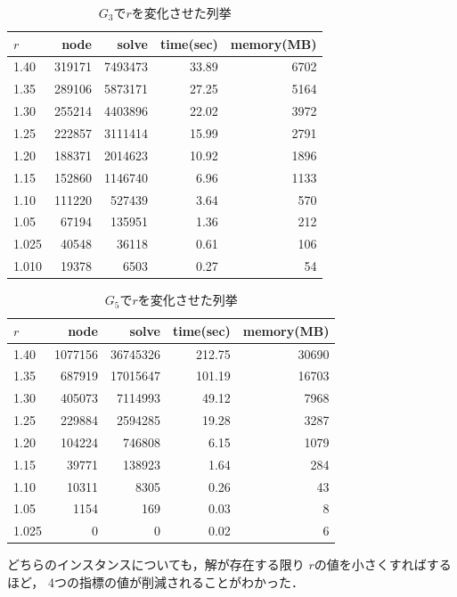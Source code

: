 \begin{table}[htbp]
  \caption{$G_3$で$r$を変化させた列挙}
  \label{table:g3_r}
  \centering
  \begin{tabular}{l||r|r|r|r}
    \hline
    $r$ & node & solve & time(sec) & memory(MB) \\
    \hline \hline
    1.40 & 319171 & 7493473 &	33.89 &	6702 \\
    1.35 & 289106 &	5873171 &	27.25 &	5164 \\
    1.30 & 255214	& 4403896	& 22.02	& 3972 \\
    1.25 & 222857	& 3111414	& 15.99	& 2791 \\
    1.20 & 188371	& 2014623	& 10.92	& 1896 \\
    1.15 & 152860	& 1146740	& 6.96	& 1133 \\
    1.10 & 111220	& 527439	& 3.64	& 570 \\
    1.05 & 67194	& 135951	& 1.36	& 212 \\
    1.025 & 40548	& 36118	& 0.61	& 106 \\
    1.010 & 19378	& 6503 & 0.27 & 54 \\
    \hline
  \end{tabular}
\end{table}

\begin{table}[htbp]
  \caption{$G_5$で$r$を変化させた列挙}
  \label{table:g5_r}
  \centering
  \begin{tabular}{l||r|r|r|r}
    \hline
    $r$ & node & solve & time(sec) & memory(MB) \\
    \hline \hline
    1.40	& 1077156	& 36745326 & 212.75	& 30690 \\
    1.35	& 687919	& 17015647 & 101.19	& 16703 \\
    1.30	& 405073	& 7114993	& 49.12 & 7968 \\
    1.25	& 229884	& 2594285	& 19.28 & 3287 \\
    1.20	& 104224	& 746808	& 6.15	& 1079 \\
    1.15	& 39771	& 138923	& 1.64	& 284 \\
    1.10	& 10311	& 8305	& 0.26	& 43 \\
    1.05	& 1154	& 169	& 0.03	& 8 \\
    1.025	& 0	& 0	& 0.02	& 6 \\
    \hline
  \end{tabular}
\end{table}

どちらのインスタンスについても，解が存在する限り
$r$の値を小さくすればするほど，
4つの指標の値が削減されることがわかった．

